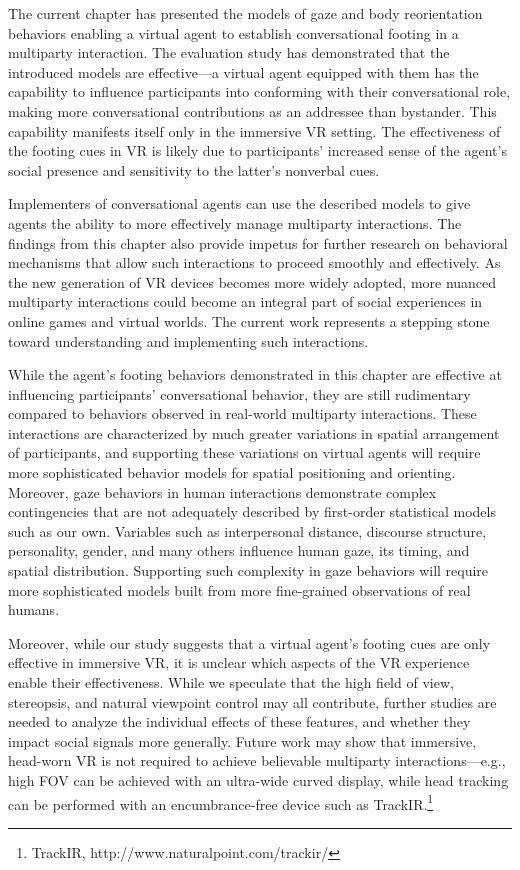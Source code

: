 The current chapter has presented the models of gaze and body reorientation behaviors enabling a virtual agent to establish conversational footing in a multiparty interaction.
The evaluation study has demonstrated that the introduced models are effective---a virtual agent equipped with them has the capability to influence participants into conforming with their conversational role, making more conversational contributions as an addressee than bystander. This capability manifests itself only in the immersive VR setting. The effectiveness of the footing cues in VR is likely due to participants' increased sense of the agent's social presence and sensitivity to the latter's nonverbal cues.

Implementers of conversational agents can use the described models to give agents the ability to more effectively manage multiparty interactions. The findings from this chapter also provide impetus for further research on behavioral mechanisms that allow such interactions to proceed smoothly and effectively. As the new generation of VR devices becomes more widely adopted, more nuanced multiparty interactions could become an integral part of social experiences in online games and virtual worlds. The current work represents a stepping stone toward understanding and implementing such interactions.

While the agent's footing behaviors demonstrated in this chapter are effective at influencing participants' conversational behavior, they are still rudimentary compared to behaviors observed in real-world multiparty interactions. These interactions are characterized by much greater variations in spatial arrangement of participants, and supporting these variations on virtual agents will require more sophisticated behavior models for spatial positioning and orienting. Moreover, gaze behaviors in human interactions demonstrate complex contingencies that are not adequately described by first-order statistical models such as our own. Variables such as interpersonal distance, discourse structure, personality, gender, and many others influence human gaze, its timing, and spatial distribution. Supporting such complexity in gaze behaviors will require more sophisticated models built from more fine-grained observations of real humans.

Moreover, while our study suggests that a virtual agent's footing cues are only effective in immersive VR, it is unclear which aspects of the VR experience enable their effectiveness. While we speculate that the high field of view, stereopsis, and natural viewpoint control may all contribute, further studies are needed to analyze the individual effects of these features, and whether they impact social signals more generally. Future work may show that immersive, head-worn VR is not required to achieve believable multiparty interactions---e.g., high FOV can be achieved with an ultra-wide curved display, while head tracking can be performed with an encumbrance-free device such as TrackIR.\footnote{TrackIR, http://www.naturalpoint.com/trackir/} 
